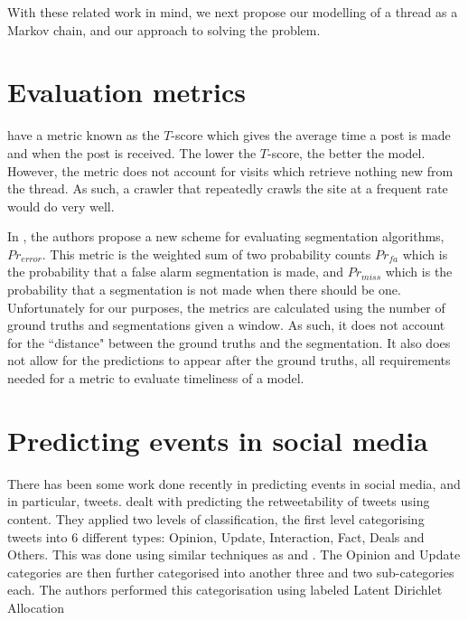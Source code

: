 
With these related work in mind, we next propose our modelling of a thread as a 
Markov chain, and our approach to solving the problem.


\section{Evaluation metrics}
 have a metric known as the $T$-score which gives the average 
time a post is made and when the post is received. The lower the $T$-score, the 
better the model. However, the metric does not account for visits which retrieve 
nothing new from the thread.  As such, a crawler that repeatedly crawls the site 
at a frequent rate would do very well.

In , the authors propose a new scheme for evaluating 
segmentation algorithms, $Pr_{error}$. This metric is the weighted sum of two 
probability counts $Pr_{fa}$ which is the probability that a false alarm 
segmentation is made, and $Pr_{miss}$ which is the probability that a 
segmentation is not made when there should be one. Unfortunately for our 
purposes, the metrics are calculated using the number of ground truths and 
segmentations given a window. As such, it does not account for the ``distance" 
between the ground truths and the segmentation. It also does not allow for the 
predictions to appear after the ground truths, all requirements needed for a 
metric to evaluate timeliness of a model.

\section{Predicting events in social media}
There has been some work done recently in predicting events in social media, and 
in particular, tweets.   dealt with predicting the retweetability 
of tweets using content. They applied two levels of classification, the first 
level categorising tweets into 6 different types: Opinion, Update, Interaction, 
Fact, Deals and Others. This was done using similar techniques as 
 and . The Opinion and Update categories 
are then further categorised into another three and two sub-categories each. The 
authors performed this categorisation using labeled Latent Dirichlet Allocation 

